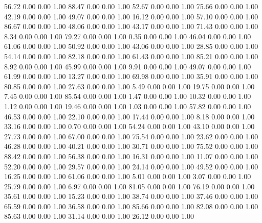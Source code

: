    56.72   0.00   0.00   1.00
   88.47   0.00   0.00   1.00
   52.67   0.00   0.00   1.00
   75.66   0.00   0.00   1.00
   42.19   0.00   0.00   1.00
   49.07   0.00   0.00   1.00
   16.12   0.00   0.00   1.00
   57.10   0.00   0.00   1.00
   86.67   0.00   0.00   1.00
   48.06   0.00   0.00   1.00
   43.17   0.00   0.00   1.00
   71.43   0.00   0.00   1.00
    8.34   0.00   0.00   1.00
   79.27   0.00   0.00   1.00
    0.35   0.00   0.00   1.00
   46.04   0.00   0.00   1.00
   61.06   0.00   0.00   1.00
   50.92   0.00   0.00   1.00
   43.06   0.00   0.00   1.00
   28.85   0.00   0.00   1.00
   54.14   0.00   0.00   1.00
   82.18   0.00   0.00   1.00
   61.43   0.00   0.00   1.00
   85.21   0.00   0.00   1.00
    8.92   0.00   0.00   1.00
   45.99   0.00   0.00   1.00
    9.91   0.00   0.00   1.00
   49.07   0.00   0.00   1.00
   61.99   0.00   0.00   1.00
   13.27   0.00   0.00   1.00
   69.98   0.00   0.00   1.00
   35.91   0.00   0.00   1.00
   80.85   0.00   0.00   1.00
   27.63   0.00   0.00   1.00
    5.49   0.00   0.00   1.00
   19.75   0.00   0.00   1.00
    7.45   0.00   0.00   1.00
   85.54   0.00   0.00   1.00
    1.47   0.00   0.00   1.00
   10.32   0.00   0.00   1.00
    1.12   0.00   0.00   1.00
   19.46   0.00   0.00   1.00
    1.03   0.00   0.00   1.00
   57.82   0.00   0.00   1.00
   46.53   0.00   0.00   1.00
   22.10   0.00   0.00   1.00
   17.44   0.00   0.00   1.00
    8.18   0.00   0.00   1.00
   33.16   0.00   0.00   1.00
    0.70   0.00   0.00   1.00
   54.24   0.00   0.00   1.00
   43.10   0.00   0.00   1.00
   27.73   0.00   0.00   1.00
   67.00   0.00   0.00   1.00
   75.54   0.00   0.00   1.00
   23.62   0.00   0.00   1.00
   46.28   0.00   0.00   1.00
   40.21   0.00   0.00   1.00
   30.71   0.00   0.00   1.00
   75.52   0.00   0.00   1.00
   88.42   0.00   0.00   1.00
   56.38   0.00   0.00   1.00
   16.31   0.00   0.00   1.00
   11.07   0.00   0.00   1.00
   52.20   0.00   0.00   1.00
   29.57   0.00   0.00   1.00
   24.14   0.00   0.00   1.00
   49.52   0.00   0.00   1.00
   16.25   0.00   0.00   1.00
   61.06   0.00   0.00   1.00
    5.01   0.00   0.00   1.00
    3.07   0.00   0.00   1.00
   25.79   0.00   0.00   1.00
    6.97   0.00   0.00   1.00
   81.05   0.00   0.00   1.00
   76.19   0.00   0.00   1.00
   35.61   0.00   0.00   1.00
   15.23   0.00   0.00   1.00
   38.74   0.00   0.00   1.00
   37.46   0.00   0.00   1.00
   65.59   0.00   0.00   1.00
   36.58   0.00   0.00   1.00
   85.66   0.00   0.00   1.00
   82.08   0.00   0.00   1.00
   85.63   0.00   0.00   1.00
   31.14   0.00   0.00   1.00
   26.12   0.00   0.00   1.00
